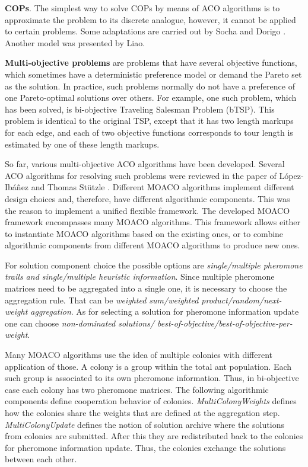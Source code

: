 \documentclass[12pt]{article}
\begin{document}
\textbf{COPs}. The simplest way to solve COPs by means of ACO algorithms is to approximate the problem to its discrete analogue, however, it cannot be applied to certain problems. Some adaptations are carried out by Socha and Dorigo \cite{aco_continuous}. Another model was presented by Liao\cite{aco_incremental}.

\textbf{Multi-objective problems} are problems that have several objective functions, which sometimes have a deterministic preference model or demand the Pareto set as the solution. In practice, such problems normally do not have a preference of one Pareto-optimal solutions over others. For example, one such problem, which has been solved, is bi-objective Traveling Salesman Problem (bTSP). This problem is identical to the original TSP, except that it has two length markups for each edge, and each of two objective functions corresponds to tour length is estimated by one of these length markups.

So far, various multi-objective ACO algorithms have been developed. Several ACO algorithms for resolving such problems were reviewed in the paper of L{\'o}pez-Ib{\'a}{\~n}ez and Thomas St{\"u}tzle \cite{moaco}. Different MOACO algorithms implement different design choices and, therefore, have different algorithmic components. This was the reason to implement a unified flexible framework. The developed MOACO framework encompasses many MOACO algorithms. This framework allows either to instantiate MOACO algorithms based on the existing ones, or to combine algorithmic components from different MOACO algorithms to produce new ones.

For solution component choice the possible options are \emph{single/multiple pheromone trails and single/multiple heuristic information}. Since multiple pheromone matrices need to be aggregated into a single one, it is necessary to choose the aggregation rule. That can be \emph{weighted sum/weighted product/random/next-weight aggregation}. As for selecting a solution for pheromone information update one can choose \emph{non-dominated solutions/ best-of-objective/best-of-objective-per-weight}.

Many MOACO algorithms use the idea of multiple colonies with different application of those. A colony is a group within the total ant population. Each such group is associated to its own pheromone information. Thus, in bi-objective case each colony has two pheromone matrices. The following algorithmic components define cooperation behavior of colonies. \emph{MultiColonyWeights} defines how the colonies share the weights that are defined at the aggregation step. \emph{MultiColonyUpdate} defines the notion of solution archive where the solutions from colonies are submitted. After this they are redistributed back to the colonies for pheromone information update. Thus, the colonies exchange the solutions between each other.
\end{document}
